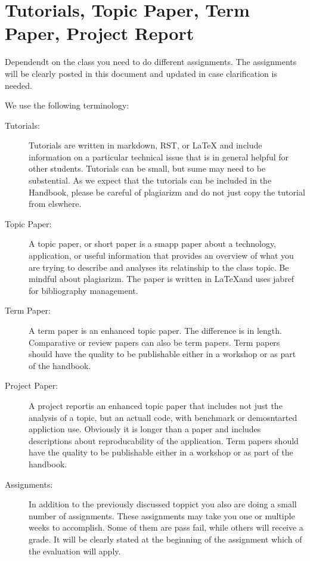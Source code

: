 
\section{Tutorials, Topic Paper, Term Paper, Project Report}

\FILENAME

Dependendt on the class you need to do different assignments. The
assignments will be clearly posted in this document and updated in
case clarification is needed. 

We use the following terminology:

\begin{description}

\item[Tutorials:] Tutorials are written in markdown, RST, or LaTeX and
  include information on a particular technical issue that is in
  general helpful for other students. Tutorials can be small, but sume
  may need to be substential. As we expect that the tutorials can be
  included in the Handbook, please be careful of plagiarizm and do not
  just copy the tutorial from elswhere. 

\item[Topic Paper:] A topic paper, or short paper is a smapp paper
  about a technology, application, or useful information that provides
  an overview of what you are trying to describe and analyses its
  relatinship to the class topic. Be mindful about plagiarizm. The
  paper is written in \LaTeX and uses jabref for bibliography management. 

\item[Term Paper:] A term paper is an enhanced topic paper. The
  difference is in length. Comparative or review papers can also be
  term papers.  Term papers should have the quality to be publishable
  either in a workshop or as part of the handbook.

\item[Project Paper:] A project reportis an enhanced topic paper that
  includes not just the analysis of a topic, but an actuall code, with
  benchmark or demosntarted appliction use. Obviously it is longer
  than a paper and includes descriptions about reproducability of the
  application. Term papers should have the quality to be publishable
  either in a workshop or as part of the handbook.

\item[Assignments:] In addition to the previously discussed toppict
  you also are doing a small number of assignments. These assignments
  may take you one or multiple weeks to accomplish. Some of them are
  pass fail, while others will receive a grade. It will be clearly
  stated at the beginning of the assignment which of the evaluation
  will apply.

\end{description}


